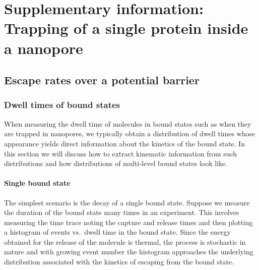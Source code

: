 \chapter[SI: Trapping of a single protein inside a nanopore]%
        {Supplementary information: Trapping of a single protein inside a nanopore}
%
\label{ch:trapping_appendix}
%

\begin{shaded}
\newpage
\end{shaded}


%
\section{Escape rates over a potential barrier}
%
\label{sec:trapping_appendix:escape_rates}
%


\subsection{Dwell times of bound states}
%

When measuring the dwell time of molecules in bound states such as when they are trapped in nanopores, we
typically obtain a distribution of dwell times whose appearance yields direct information about the kinetics
of the bound state. In this section we will discuss how to extract kinematic information from such
distributions and how distributions of multi-level bound states look like.


\subsubsection{Single bound state}
%
\label{sec:trapping_appendix:single_bound_state}
%

The simplest scenario is the decay of a single bound state. Suppose we measure the duration of the bound state
many times in an experiment. This involves measuring the time trace noting the capture and release times and
then plotting a histogram of events vs.~dwell time in the bound state. Since the energy obtained for the
release of the molecule is thermal, the process is stochastic in nature and with growing event number the
histogram approaches the underlying distribution associated with the kinetics of escaping from the bound
state.

